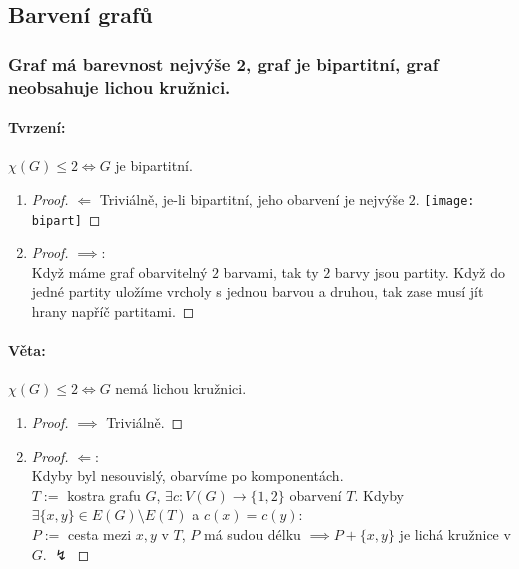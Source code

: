 \documentclass[10pt,a4paper]{article}
\begin{document}
\subsection{Barvení grafů}

\subsubsection{Graf má barevnost nejvýše 2, graf je bipartitní, graf neobsahuje lichou kružnici.}
\paragraph*{Tvrzení:} $\chi (G) \leq 2 \iff G$ je bipartitní.
\begin{enumerate}
    \item \begin{proof} $\Longleftarrow$ Triviálně, je-li bipartitní, jeho obarvení je nejvýše $2$. \texttt{[image: bipart]} \end{proof}
    \item \begin{proof} $\implies$:\\
            Když máme graf obarvitelný $2$ barvami, tak ty $2$ barvy jsou partity. Když do jedné partity uložíme vrcholy s jednou barvou a druhou, tak zase musí jít hrany napříč partitami.
        \end{proof}
\end{enumerate}

\paragraph*{Věta:} $\chi (G) \leq 2 \iff G$ nemá lichou kružnici.
\begin{enumerate}
    \item \begin{proof} $\implies$ Triviálně. \end{proof}
    \item \begin{proof} $\Longleftarrow$:\\
           Kdyby byl nesouvislý, obarvíme po komponentách. \\
           $T:=$ kostra grafu $G$, $\exists c: V(G) \to \{1,2\}$ obarvení $T$. Kdyby $\exists \{x,y\} \in E(G) \setminus E(T)$ a $c(x) = c(y)$:\\
           $P:= $ cesta mezi $x,y$ v $T$, $P$ má sudou délku $\implies P+\{x,y\}$ je lichá kružnice v $G$. $\lightning$
        \end{proof}
\end{enumerate}
\end{document}
